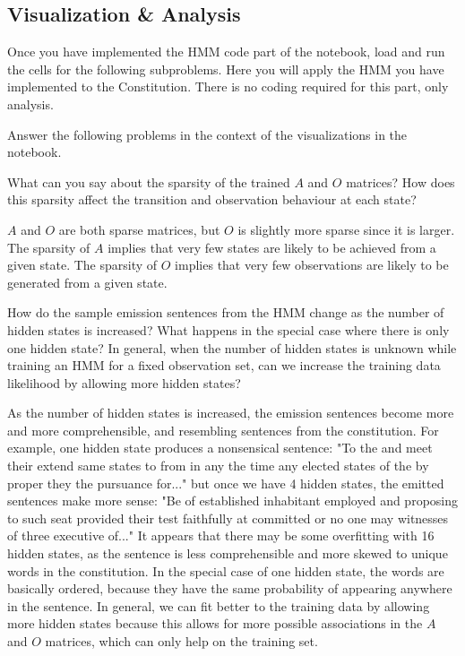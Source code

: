\subsection{Visualization \& Analysis}

Once you have implemented the HMM code part of the notebook, load and run the cells for the following subproblems. Here you will apply the HMM you have implemented to the Constitution. There is no coding required for this part, only analysis.

Answer the following problems in the context of the visualizations in the notebook.

\indent\problem[3] %
What can you say about the sparsity of the trained $A$ and $O$ matrices? How does this sparsity affect the transition and observation behaviour at each state?
\begin{solution}
  $A$ and $O$ are both sparse matrices, but $O$ is slightly more sparse since it is larger. The sparsity of $A$ implies that very few states are likely to be achieved from a given state. The sparsity of $O$ implies that very few observations are likely to be generated from a given state.
\end{solution}

\indent\problem[5] %
How do the sample emission sentences from the HMM change as the number of hidden states is increased? What happens in the special case where there is only one hidden state? In general, when the number of hidden states is unknown while training an HMM for a fixed observation set, can we increase the training data likelihood by allowing more hidden states?

\begin{solution}
  As the number of hidden states is increased, the emission sentences become more and more comprehensible, and resembling sentences from the constitution. For example, one hidden state produces a nonsensical sentence: "To the and meet their extend same states to from in any the time any elected states of the by proper they the pursuance for..." but once we have 4 hidden states, the emitted sentences make more sense: "Be of established inhabitant employed and proposing to such seat provided their test faithfully at committed or no one may witnesses of three executive of..." It appears that there may be some overfitting with 16 hidden states, as the sentence is less comprehensible and more skewed to unique words in the constitution. In the special case of one hidden state, the words are basically ordered, because they have the same probability of appearing anywhere in the sentence. In general, we can fit better to the training data by allowing more hidden states because this allows for more possible associations in the $A$ and $O$ matrices, which can only help on the training set.
\end{solution}


